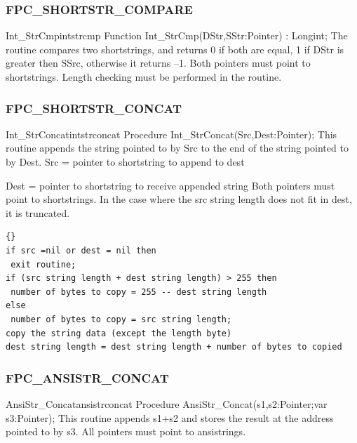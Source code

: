 \documentclass [a4paper,12pt]{article}
\begin{document}
\subsubsection{FPC{\_}SHORTSTR{\_}COMPARE}
\label{subsubsec:mylabel37}

\begin{functionl}{Int{\_}StrCmp}{intstrcmp}
\Declaration
Function Int{\_}StrCmp(DStr,SStr:Pointer) : Longint;
\Description
The routine compares two shortstrings, and returns 0 if both are equal, 1 if
\textsf{DStr} is greater then \textsf{SSrc}, otherwise it returns --1.
\Notes
Both pointers must point to shortstrings. Length checking must be performed
in the routine.
\end{functionl}

\subsubsection{FPC{\_}SHORTSTR{\_}CONCAT}
\label{subsubsec:mylabel38}

\begin{procedurel}{Int{\_}StrConcat}{intstrconcat}
\Declaration
Procedure Int{\_}StrConcat(Src,Dest:Pointer);
\Description
This routine appends the string pointed to by \textsf{Src} to the end of the
string pointed to by \textsf{Dest}.
\Parameters
Src  = pointer to shortstring to append to dest \par
Dest = pointer to shortstring to receive appended string
\Notes
Both pointers must point to shortstrings. In the case where the src string
length does not fit in dest, it is truncated.
\Algorithm
\begin{lstlisting}{}
if src =nil or dest = nil then 
 exit routine;
if (src string length + dest string length) > 255 then
 number of bytes to copy = 255 -- dest string length
else
 number of bytes to copy = src string length;
copy the string data (except the length byte)
dest string length = dest string length + number of bytes to copied
\end{lstlisting}
\end{procedurel}

\subsubsection{FPC{\_}ANSISTR{\_}CONCAT}
\label{subsubsec:mylabel39}

\begin{procedurel}{AnsiStr{\_}Concat}{ansistrconcat}
\Declaration
Procedure AnsiStr{\_}Concat(s1,s2:Pointer;var s3:Pointer);
\Description
This routine appends \textsf{s1}+\textsf{s2} and stores the result at the
address pointed to by \textsf{s3}.
\Notes
All pointers must point to ansistrings. 
\end{procedurel}
\end{document}
